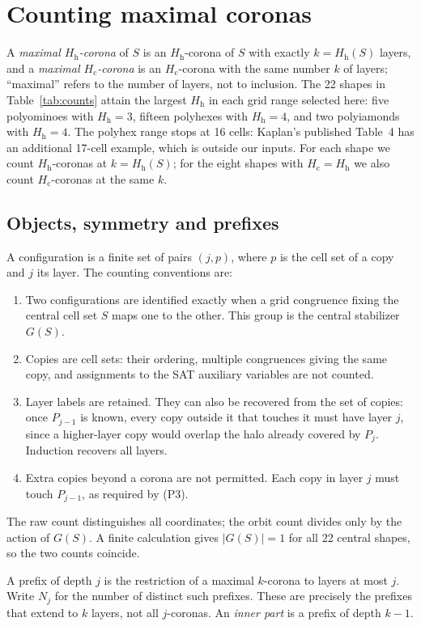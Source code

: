 \documentclass[10pt,a4paper]{article}
\theoremstyle{definition}
\theoremstyle{remark}
\newcommand{\Hc}{H_{\mathrm c}}
\newcommand{\Hh}{H_{\mathrm h}}
\begin{document}
\section{Counting maximal coronas}
\label{sec:counts}
A \emph{maximal $\Hh$-corona} of $S$ is an $\Hh$-corona of $S$ with
exactly $k=\Hh(S)$ layers, and a \emph{maximal $\Hc$-corona} is an
$\Hc$-corona with the same number $k$ of layers; ``maximal'' refers to the
number of layers, not to inclusion.
The 22 shapes in Table~\ref{tab:counts} attain the largest $\Hh$ in
each grid range selected here: five polyominoes with $\Hh=3$, fifteen
polyhexes with $\Hh=4$, and two polyiamonds with $\Hh=4$. The polyhex
range stops at 16 cells: Kaplan's published Table~4 has an additional
17-cell example, which is outside our inputs. For each shape we count
$\Hh$-coronas at $k=\Hh(S)$; for the eight shapes with $\Hc=\Hh$ we
also count $\Hc$-coronas at the same $k$.

\subsection{Objects, symmetry and prefixes}
A configuration is a finite set of pairs $(j,p)$, where $p$ is the cell
set of a copy and $j$ its layer. The counting conventions are:
\begin{enumerate}
\item Two configurations are identified exactly when a grid congruence
fixing the central cell set $S$ maps one to the other. This group is the
central stabilizer $G(S)$.
\item Copies are cell sets: their ordering, multiple congruences giving
the same copy, and assignments to the SAT auxiliary variables are not
counted.
\item Layer labels are retained. They can also be recovered from the
set of copies: once $P_{j-1}$ is known, every copy outside it that touches
it must have layer $j$, since a higher-layer copy would overlap the
halo already covered by $P_j$. Induction recovers all layers.
\item Extra copies beyond a corona are not permitted. Each copy in
layer $j$ must touch $P_{j-1}$, as required by (P3).
\end{enumerate}
The raw count distinguishes all coordinates; the orbit count divides
only by the action of $G(S)$. A finite calculation gives $|G(S)|=1$ for
all 22 central shapes, so the two counts coincide.

A prefix of depth $j$ is the restriction of a maximal $k$-corona to
layers at most $j$. Write $N_j$ for the number of distinct such prefixes.
These are precisely the prefixes that extend to $k$ layers, not all
$j$-coronas. An \emph{inner part} is a prefix of depth $k-1$.
\end{document}
